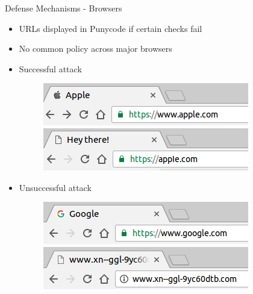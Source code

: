 \documentclass[usepdftitle=false]{beamer}
\begin{document}
\begin{frame}{Defense Mechanisms - Browsers}
\begin{itemize}
\item URLs displayed in Punycode if certain checks fail
\item No common policy across major browsers
\item Successful attack
\begin{figure}
  \begin{minipage}{0.45\textwidth}
    \includegraphics[width=.95\linewidth]{images/apple}
  \end{minipage}
  \begin{minipage}{0.45\textwidth}
    \includegraphics[width=.95\linewidth]{images/fakeapple-punycode}
  \end{minipage}
\end{figure}

\item Unsuccessful attack

\begin{figure}
  \begin{minipage}{0.45\textwidth}
    \includegraphics[width=0.95\linewidth]{images/google}
  \end{minipage}
  \begin{minipage}{0.45\textwidth}
    \includegraphics[width=0.95\linewidth]{images/fakegoogle-punycode}
  \end{minipage}
\end{figure}

\end{itemize}

\end{frame}
\end{document}

